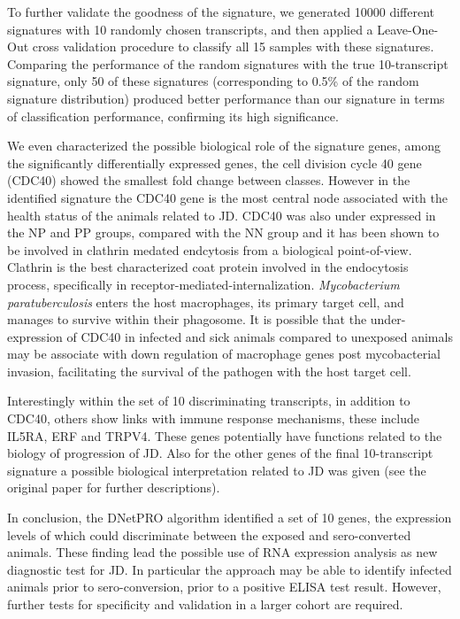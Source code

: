 \documentclass{standalone}
\begin{document}
To further validate the goodness of the signature, we generated 10000 different signatures with 10 randomly chosen transcripts, and then applied a Leave-One-Out cross validation procedure to classify all 15 samples with these signatures.
Comparing the performance of the random signatures with the true 10-transcript signature, only 50 of these signatures (corresponding to 0.5\% of the random signature distribution) produced better performance than our signature in terms of classification performance, confirming its high significance.

We even characterized the possible biological role of the signature genes, among the significantly differentially expressed genes, the cell division cycle 40 gene (CDC40) showed the smallest fold change between classes.
However in the identified signature the CDC40 gene is the most central node associated with the health status of the animals related to JD.
CDC40 was also under expressed in the NP and PP groups, compared with the NN group and it has been shown to be involved in clathrin medated endcytosis from a biological point-of-view.
Clathrin is the best characterized coat protein involved in the endocytosis process, specifically in receptor-mediated-internalization.
\emph{Mycobacterium paratuberculosis} enters the host macrophages, its primary target cell, and manages to survive within their phagosome.
It is possible that the under-expression of CDC40 in infected and sick animals compared to unexposed animals may be associate with down regulation of macrophage genes post mycobacterial invasion, facilitating the survival of the pathogen with the host target cell.

Interestingly within the set of 10 discriminating transcripts, in addition to CDC40, others show links with immune response mechanisms, these include IL5RA, ERF and TRPV4.
These genes potentially have functions related to the biology of progression of JD.
Also for the other genes of the final 10-transcript signature a possible biological interpretation related to JD was given (see the original paper for further descriptions).

In conclusion, the \textsf{DNetPRO} algorithm identified a set of 10 genes, the expression levels of which could discriminate between the exposed and sero-converted animals.
These finding lead the possible use of RNA expression analysis as new diagnostic test for JD.
In particular the approach may be able to identify infected animals prior to sero-conversion, prior to a positive ELISA test result.
However, further tests for specificity and validation in a larger cohort are required.



\end{document}
